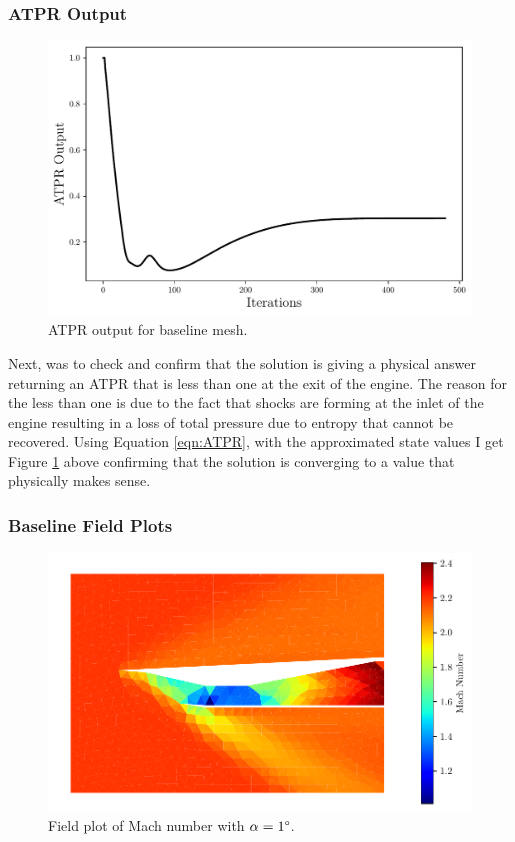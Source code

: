 \pagebreak
\subsubsection{ATPR Output}
\begin{figure}[h]
    \centering
    \includegraphics[width = 0.9\linewidth]{rep/q3/ATPR.pdf}
    \caption[ATPR Output for Baseline Mesh]{ATPR output for baseline mesh.}
    \label{fig:ATPR_mesh0}
\end{figure}

Next, was to check and confirm that the solution is giving a physical answer returning an ATPR that is less than one at the exit of the engine. The reason for the less than one is due to the fact that shocks are forming at the inlet of the engine resulting in a loss of total pressure due to entropy that cannot be recovered. Using Equation \ref{eqn:ATPR}, with the approximated state values I get Figure \ref{fig:ATPR_mesh0} above confirming that the solution is converging to a value that physically makes sense.

\pagebreak
\subsubsection{Baseline Field Plots}

\begin{figure}[h]
    \centering
    \includegraphics[width = 0.9\linewidth]{rep/q3/Machfield.pdf}
    \caption[Field Plot of Mach Number for Baseline Mesh]{Field plot of Mach number with $\alpha = 1\degree$.}
    \label{fig:mach_mesh0}
\end{figure}

